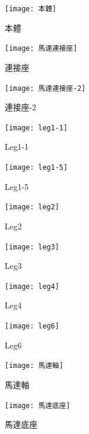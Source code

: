 \begin{figure}[htbp]
  \begin{minipage}[t]{0.3\linewidth}
    \centering
    \texttt{[image: 本體]}
    \caption{本體}
    \label{本體}
  \end{minipage}
  \hfill
  \begin{minipage}[t]{0.3\linewidth}
    \centering
    \texttt{[image: 馬達連接座]}
    \caption{連接座}
    \label{馬達連接座}
  \end{minipage}
  \hfill
  \begin{minipage}[t]{0.3\linewidth}
    \centering
    \texttt{[image: 馬達連接座-2]}
    \caption{連接座-2}
    \label{馬達連接座-2}
  \end{minipage}
\end{figure}

\begin{figure}[htbp]
  \begin{minipage}[t]{0.3\linewidth}
    \centering
    \texttt{[image: leg1-1]}
    \caption{Leg1-1}
    \label{leg1-1}
  \end{minipage}
  \hfill
  \begin{minipage}[t]{0.3\linewidth}
    \centering
    \texttt{[image: leg1-5]}
    \caption{Leg1-5}
    \label{leg1-5}
  \end{minipage}
  \hfill
  \begin{minipage}[t]{0.3\linewidth}
    \centering
    \texttt{[image: leg2]}
    \caption{Leg2}
    \label{leg2}
  \end{minipage}
\end{figure}

\begin{figure}[htbp]
  \begin{minipage}[t]{0.3\linewidth}
    \centering
    \texttt{[image: leg3]}
    \caption{Leg3}
    \label{leg3}
  \end{minipage}
  \hfill
  \begin{minipage}[t]{0.3\linewidth}
    \centering
    \texttt{[image: leg4]}
    \caption{Leg4}
    \label{leg4}
  \end{minipage}
  \hfill
  \begin{minipage}[t]{0.3\linewidth}
    \centering
    \texttt{[image: leg6]}
    \caption{Leg6}
    \label{leg6}
  \end{minipage}
\end{figure}

\begin{figure}[htbp]
  \centering
  \begin{minipage}{0.3\linewidth}
    \centering
    \texttt{[image: 馬達軸]}
    \caption{馬達軸}
    \label{馬達軸}
  \end{minipage}
  \hfill
  \begin{minipage}{0.3\linewidth}
    \centering
    \texttt{[image: 馬達底座]}
    \caption{馬達底座}
    \label{馬達底座}
  \end{minipage}
 \end{figure}
\newpage

